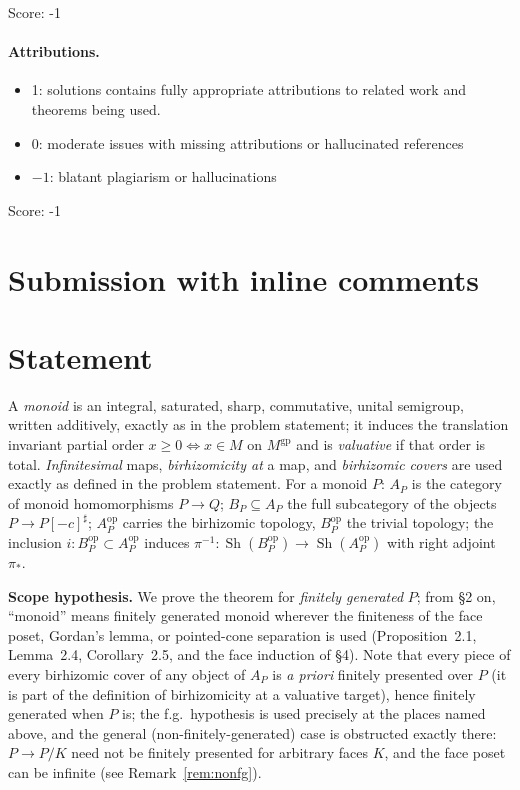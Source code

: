\documentclass[11pt]{article}
\theoremstyle{definition}
\newcommand{\gp}{\mathrm{gp}}
\newcommand{\op}{\mathrm{op}}
\newcommand{\Sh}{\operatorname{Sh}}
\begin{document}
\noindent Score: -1

\paragraph{Attributions.}
\begin{itemize}
	\item  1: solutions contains fully appropriate attributions
		to related work and theorems being used.
	\item  0: moderate issues with missing attributions or hallucinated references
	\item  $-1$: blatant plagiarism or hallucinations
\end{itemize}

\noindent Score: -1

\newpage
\section{Submission with inline comments}


\section{Statement}\label{sec:intro}

A \emph{monoid} is an integral, saturated, sharp, commutative, unital
semigroup, written additively, exactly as in the problem statement; it
induces the translation invariant partial order $x\ge0\iff x\in M$ on
$M^{\gp}$ and is \emph{valuative} if that order is total.
\emph{Infinitesimal} maps, \emph{birhizomicity at} a map, and
\emph{birhizomic covers} are used exactly as defined in the problem
statement. For a monoid $P$: $A_P$ is the category of monoid
homomorphisms $P\to Q$; $B_P\subseteq A_P$ the full subcategory of the
objects $P\to P[-c]^{\sharp}$; $A_P^{\op}$ carries the birhizomic
topology, $B_P^{\op}$ the trivial topology; the inclusion
$i:B_P^{\op}\subset A_P^{\op}$ induces
$\pi^{-1}:\Sh(B_P^{\op})\to\Sh(A_P^{\op})$ with right adjoint $\pi_{*}$.

\noindent\textbf{Scope hypothesis.} We prove the theorem for
\emph{finitely generated} $P$; 
from \S2 on, ``monoid'' means
finitely generated monoid wherever the finiteness of the face poset,
Gordan's lemma, or pointed-cone separation is used (Proposition~2.1,
Lemma~2.4, Corollary~2.5, and the face induction of \S4).
Note that
every piece of every birhizomic cover of any object of $A_P$ is
\emph{a priori} finitely presented over $P$ (it is part of the
definition of birhizomicity at a valuative target), hence finitely
generated when $P$ is; the f.g.\ hypothesis is used precisely at the
places named above, and the general (non-finitely-generated) case is
obstructed exactly there: $P\to P/K$ need not be finitely presented
for arbitrary faces $K$, and the face poset can be infinite (see
Remark~\ref{rem:nonfg}).
\end{document}
